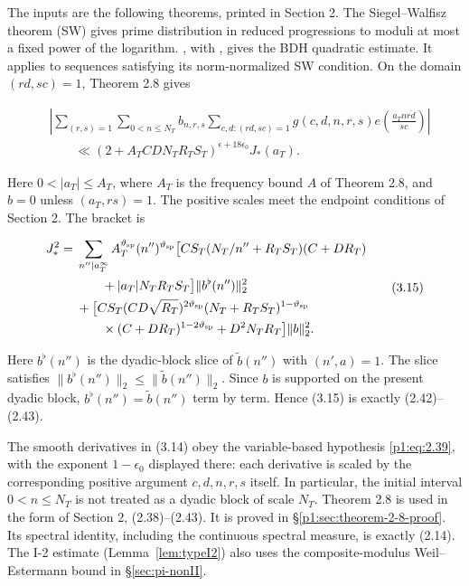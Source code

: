 The inputs are the following theorems, printed in Section 2.
The Siegel--Walfisz theorem (SW) \cite[Corollary~5.29]{IK04} gives prime distribution in reduced progressions
to moduli at most a fixed power of the logarithm.
\cite[Theorem~0(a), (2.2)]{BFI86}, with \cite[(A2)]{BFI86},
gives the BDH quadratic estimate.
It applies to sequences satisfying its norm-normalized SW condition.
On the domain $(rd,sc)=1$, Theorem 2.8 gives

\[
\begin{aligned}
&\left|\sum_{(r,s)=1}\sum_{0<n\le N_T}b_{n,r,s}
 \sum_{c,d:(rd,sc)=1}g(c,d,n,r,s)
 e\left(\frac{a_Tn\overline{rd}}{sc}\right)\right|\\
&\qquad\ll (2+A_T C D N_T R_T S_T)^{\epsilon+18\epsilon_0}J_*(a_T).
\end{aligned}
\tag{3.14}
\]

Here $0<|a_T|\le A_T$, where $A_T$ is the frequency bound $A$ of Theorem 2.8, and $b=0$ unless $(a_T,rs)=1$. The positive
scales meet the endpoint conditions of Section 2. The bracket is

\[
\begin{aligned}
J_*^2={}&\sum_{n''\mid a_T^\infty}A_T^{\vartheta_{\rm sp}}(n'')^{\vartheta_{\rm sp}}
 \bigl[C S_T(N_T/n''+R_TS_T)(C+DR_T)\\
&\qquad+|a_T|N_TR_TS_T\bigr]\|b^\flat(n'')\|_2^2\\
&+\bigl[C S_T(CD\sqrt{R_T})^{2\vartheta_{\rm sp}}
 (N_T+R_TS_T)^{1-\vartheta_{\rm sp}}\\
&\qquad\times(C+DR_T)^{1-2\vartheta_{\rm sp}}
       +D^2N_TR_T\bigr]\|b\|_2^2.
\end{aligned}
\tag{3.15}
\]

Here $b^\flat(n'')$ is the dyadic-block slice of $\tilde b(n'')$
with $(n',a)=1$. The slice satisfies
$\|b^\flat(n'')\|_2\le\|\tilde b(n'')\|_2$.
Since $b$ is supported on the present dyadic block,
$b^\flat(n'')=\tilde b(n'')$ term by term.
Hence (3.15) is exactly (2.42)--(2.43).

The smooth derivatives in (3.14) obey the variable-based hypothesis
\eqref{p1:eq:2.39}, with the exponent $1-\epsilon_0$ displayed there:
each derivative is scaled by the corresponding positive argument
$c,d,n,r,s$ itself. In particular, the initial interval
$0<n\le N_T$ is not treated as a dyadic block of scale $N_T$.
Theorem 2.8 is used in the form of Section 2, (2.38)--(2.43).
It is proved in \S\ref{p1:sec:theorem-2-8-proof}.
Its spectral identity, including the continuous spectral measure, is exactly (2.14).
The I-2 estimate (Lemma~\ref{lem:typeI2}) also uses the composite-modulus Weil--Estermann bound \cite{Weil48,Estermann61} in \S\ref{sec:pi-nonII}.

